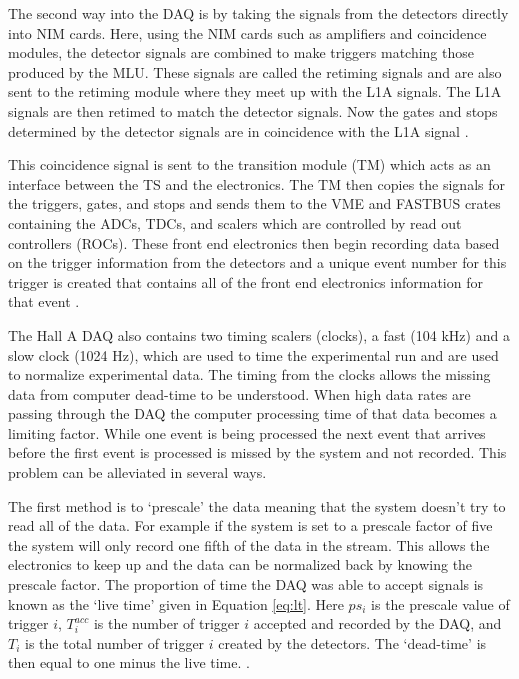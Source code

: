 The second way into the DAQ is by taking the signals from the detectors directly into NIM cards. Here, using the NIM cards such as amplifiers and coincidence modules, the detector signals are combined to make triggers matching those produced by the MLU. These signals are called the retiming signals and are also sent to the retiming module where they meet up with the L1A signals. The L1A signals are then retimed to match the detector signals. Now the gates and stops determined by the detector signals are in coincidence with the L1A signal \cite{DAQ}.

This coincidence signal is sent to the transition module (TM) which acts as an interface between the TS and the electronics. The TM then copies the signals for the triggers, gates, and stops and sends them to the VME and FASTBUS crates containing the ADCs, TDCs, and scalers which are controlled by read out controllers (ROCs). These front end electronics then begin recording data based on the trigger information from the detectors and a unique event number for this trigger is created that contains all of the front end electronics information for that event \cite{DAQ}.

The Hall A DAQ also contains two timing scalers (clocks), a fast (104 kHz) and a slow clock (1024 Hz), which are used to time the experimental run and are used to normalize experimental data. The timing from the clocks allows the missing data from computer dead-time to be understood. When high data rates are passing through the DAQ the computer processing time of that data becomes a limiting factor. While one event is being processed the next event that arrives before the first event is processed is missed by the system and not recorded. This problem can be alleviated in several ways. 

The first method is to `prescale' the data meaning that the system doesn't try to read all of the data. For example if the system is set to a prescale factor of five the system will only record one fifth of the data in the stream. This allows the electronics to keep up and the data can be normalized back by knowing the prescale factor. The proportion of time the DAQ was able to accept signals is known as the `live time' given in Equation \ref{eq:lt}. Here $ps_i$ is the prescale value of trigger $i$, $T_i^{acc}$ is the number of trigger $i$ accepted and recorded by the DAQ, and $T_i$ is the total number of trigger $i$ created by the detectors. The `dead-time' is then equal to one minus the live time. \cite{DAQ}. 

